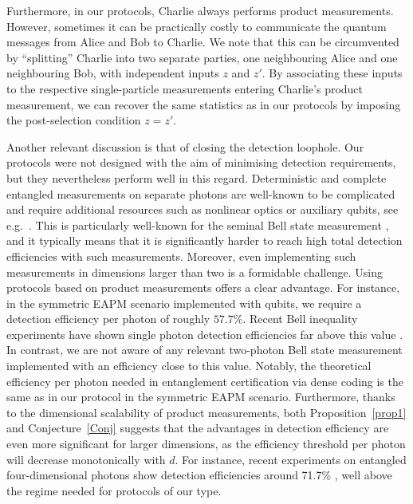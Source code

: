 \documentclass[aps,superscriptaddress,twocolumn,twoside,floatfix,pra,nofootinbib,a4paper]{revtex4-2}
\begin{document}
{Furthermore, in our protocols, Charlie always performs product measurements. However, sometimes it can be practically costly to communicate the quantum messages from Alice and Bob to Charlie. We note that this can be circumvented by ``splitting'' Charlie into two separate parties, one neighbouring Alice and one neighbouring Bob, with independent inputs $z$ and $z'$. By associating these inputs to the respective single-particle measurements entering Charlie's product measurement, we can recover the same statistics as in our protocols by imposing the post-selection condition $z=z'$.}



Another relevant discussion is that of closing the detection loophole. Our protocols were not designed with the aim of minimising detection requirements, but they nevertheless perform well in this regard.  Deterministic and complete entangled measurements on separate photons are well-known to be complicated and require additional resources such as nonlinear optics or auxiliary qubits, see e.g.~\cite{Kim2001, Barreiro2008, Williams2017}. This is particularly well-known for the seminal Bell state measurement \cite{Lutkenhaus1999}, and it typically means that it is significantly harder to reach high total detection efficiencies with such measurements. Moreover, even implementing such measurements in dimensions larger than two is a formidable challenge. Using protocols based on product measurements offers a clear advantage. For instance, in the symmetric EAPM scenario implemented with qubits, we require a detection efficiency per photon of roughly $57.7\%$. Recent Bell inequality experiments have shown single photon detection efficiencies far above this value \cite{Liu2018, Shalm2021}. In contrast, we are not aware of any relevant two-photon Bell state measurement implemented with an efficiency close to this value. Notably, the theoretical  efficiency per photon needed in entanglement certification via dense coding is the same as in our protocol in the symmetric EAPM scenario. Furthermore, thanks to the dimensional scalability of product measurements, both Proposition~\ref{prop1} and Conjecture~\ref{Conj} suggests that the advantages in detection efficiency are even more significant for larger dimensions, as the efficiency threshold per photon will decrease monotonically with $d$. For instance, recent experiments on entangled four-dimensional photons show detection efficiencies around 71.7\% \cite{Hu2022}, well above the regime needed for protocols of our type.
\end{document}
